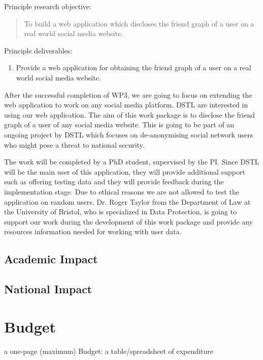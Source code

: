 \documentclass[a4paper,11pt]{article}
\begin{document}
Principle research objective:
\begin{quote}
	To build a web application which discloses the friend graph of a user on a real world social media website.
\end{quote}

Principle deliverables:
\begin{enumerate}
\item Provide a web application for obtaining the friend graph of a user on a real world social media website.
\end{enumerate}

After the successful completion of WP3, we are going to focus on extending the web application to work on any social media platform. DSTL are interested in using our web application. The aim of this work package is to disclose the friend graph of a user of any social media website. This is going to be part of an ongoing project by DSTL which focuses on de-anonymising social network users who might pose a threat to national security.

The work will be completed by a PhD student, supervised by the PI. Since DSTL will be the main user of this application, they will provide additional support such as offering testing data and they will provide feedback during the implementation stage. Due to ethical reasons we are not allowed to test the application on random users. Dr. Roger Taylor from the Department of Law at the University of Bristol, who is specialized in Data Protection, is going to support our work during the development of this work package and provide any resources information needed for working with user data.

\subsection*{Academic Impact}

\subsection*{National Impact}





\newpage
\section*{Budget}

a one-page (maximum) Budget: a table/spreadsheet of expenditure
\end{document}
